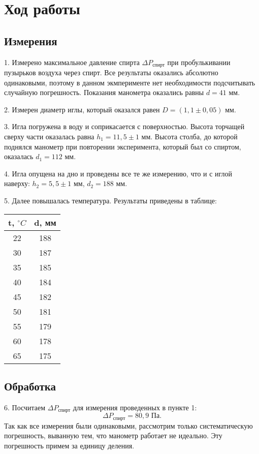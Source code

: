 \section{Ход работы}
\subsection{Измерения}
1. Измерено максимальное давление спирта $\Delta P_\text{спирт}$ при  пробулькивании пузырьков воздуха через спирт. Все результаты оказались абсолютно одинаковыми, поэтому в данном экмперименте нет необходимости подсчитывать случайную погрешность. Показания манометра оказались равны $d = 41$ мм.

2. Измерен диаметр иглы, который оказался равен $D = (1,1 \pm 0,05)$ мм.

3. Игла погружена в воду и соприкасается с поверхностью. Высота торчащей сверху части оказалась равна $h_1 = 11,5 \pm 1$ мм. Высота столба, до которой поднялся манометр при повторении эксперимента, который был со спиртом, оказалась $d_1 = 112$ мм.

4. Игла опущена на дно и проведены все те же измерению, что и с иглой наверху: $h_2 = 5,5 \pm 1$ мм,  $d_2 = 188$ мм.

5. Далее повышалась температура. Результаты приведены в таблице:

\begin{center}
\begin{tabular}[h]{|c|c|}
\hline
    t, $^\circ C$ & d, мм\\
    \hline
    22 & 188\\
    \hline
   30 & 187 \\
 \hline
   35 & 185 \\
 \hline
   40 & 184 \\
 \hline
   45 & 182 \\
 \hline
   50 & 181 \\
 \hline
   55 & 179 \\
 \hline
   60 & 178 \\
 \hline
   65 & 175 \\
 \hline
\end{tabular}
\end{center}

\subsection*{Обработка}

6. Посчитаем $\Delta P_\text{спирт}$ для измерения проведенных в пункте 1:
\begin{equation}
  \Delta P_\text{спирт} = 80,9 \text{ Па}.
  \label{equ:spirt}
\end{equation}
Так как все измерения были одинаковыми, рассмотрим только систематическую погрешность, выванную тем, что манометр работает не идеально. Эту погрешность примем за единицу деления.

